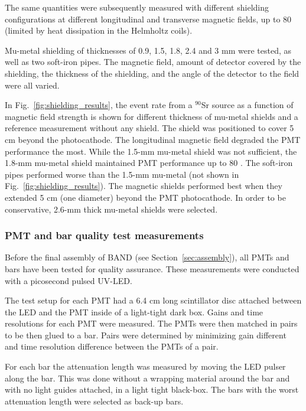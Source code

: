 \documentclass[3p,twocolumn]{elsarticle}
\begin{document}
  The same quantities were subsequently measured with different
  shielding configurations at different longitudinal and transverse
  magnetic fields, up to 80 \si{\gauss} (limited by heat dissipation in the
  Helmholtz coils).

 Mu-metal shielding of thicknesses of 0.9, 1.5, 1.8,
  2.4 and 3 \si{\milli\meter} were tested, as well as two soft-iron pipes. The magnetic field, amount of detector covered by the
  shielding, the thickness of the shielding, and the angle of the detector to the field were
  all varied.
  
In Fig.~\ref{fig:shielding_results}, the event rate from a $^{90}$Sr source as a function of magnetic field strength is shown for different thickness of mu-metal shields and a reference measurement without any shield. The shield was positioned to cover 5 \si{\centi\meter} beyond the photocathode. 
The longitudinal magnetic field degraded the PMT performance
the most.  While the 1.5-\si{\milli\meter} mu-metal shield was not
sufficient, the 1.8-\si{\milli\meter} mu-metal shield maintained PMT
performance up to 80 \si{\gauss}.  The soft-iron pipes performed worse than the
1.5-\si{\milli\meter} mu-metal (not shown in Fig.~\ref{fig:shielding_results}). The magnetic shields performed best when they
extended 5 \si{\centi\meter} (one diameter) beyond the PMT photocathode.  In order to
be conservative, 2.6-\si{\milli\meter} thick mu-metal shields were selected.


\subsubsection{PMT and bar quality test measurements}
Before the final assembly of BAND (see Section~\ref{sec:assembly}), all PMTs and bars have been tested for quality assurance. These measurements were conducted with a picosecond pulsed UV-LED.

The test setup for each PMT had a 6.4 \si{\centi\meter} long scintillator disc attached between the LED and the PMT inside of a light-tight dark box. Gains and time resolutions for each PMT were measured. The PMTs were then matched in pairs to be then glued to a bar. Pairs were determined by minimizing gain different and time resolution difference between the PMTs of a pair.

For each bar the attenuation length was measured by moving the LED pulser along the bar. This was done without a wrapping material around the bar and with no light guides attached, in a light tight black-box. The bars with the worst attenuation length were selected as back-up bars.
\end{document}
